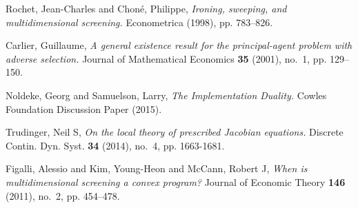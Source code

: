 \documentclass[]{beamer}
\theoremstyle{plain}
\theoremstyle{plain} %
\theoremstyle{definition}
\theoremstyle{remark}
\begin{document}
%
%
%
%
%
%
%
%
%
%
%
%
\begin{thebibliography}{03}
	
		
	Rochet, Jean-Charles and Chon{\'e}, Philippe,
	\emph{Ironing, sweeping, and multidimensional screening.}
	Econometrica  (1998), pp. 783--826.
	
	Carlier, Guillaume,
	\emph{A general existence result for the principal-agent problem with adverse selection.}
	Journal of Mathematical Economics {\bf 35} (2001), no.~1, pp. 129--150.
	
	Noldeke, Georg and Samuelson, Larry,
	\emph{The Implementation Duality.}
	Cowles Foundation Discussion Paper (2015).
	
	Trudinger, Neil S,
	\emph{On the local theory of prescribed Jacobian equations.}
	Discrete Contin. Dyn. Syst. {\bf 34} (2014), no.~4, pp. 1663-1681.
	
	Figalli, Alessio and Kim, Young-Heon and McCann, Robert J,
	\emph{When is multidimensional screening a convex program?}
	Journal of Economic Theory {\bf 146} (2011), no.~2, pp. 454--478.
	
	
\end{thebibliography}


\frame
{
   \LARGE
   \begin{center}
  {\color{blue}{Thank you!}}
   \end{center}

}
\end{document}
